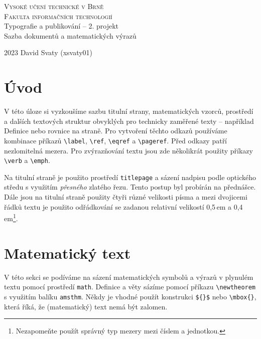 \documentclass[hidelinks, twocolumn, a4paper, 11pt]{article}
\theoremstyle{definition}
\begin{document}
\begin{titlepage}
    
    \begin{center}
        \Huge
        \textsc{Vysoké učení technické v Brně \\[0.5em]
        {\huge Fakulta informačních technologií}} \\
        {\LARGE Typografie a publikování -- 2. projekt \\[0.4em]
        Sazba dokumentů a matematických výrazů} \\
    \end{center}

    {\LARGE 2023 \hfill David Svaty (xsvaty01)}

\end{titlepage}

\section*{Úvod}
V této úloze si vyzkoušíme sazbu titulní strany, matematických vzorců, 
prostředí a dalších textových struktur obvyklých pro technicky zaměřené texty --
například Definice nebo rovnice na straně. 
Pro vytvoření těchto odkazů používáme kombinace příkazů
\verb|\label|, \verb|\ref|, \verb|\eqref| a \verb|\pageref|. Před odkazy patří nezlomitelná mezera. 
Pro zvýrazňování textu jsou zde několikrát použity příkazy \verb|\verb| a \verb|\emph|.

Na titulní straně je použito prostředí \verb|titlepage| a sázení nadpisu podle optického
středu s využitím \textsl{přesného} zlatého řezu. Tento postup byl probírán na přednášce.
Dále jsou na titulní straně použity čtyři různé velikosti písma a 
mezi dvojicemi řádků textu je použito odřádkování se zadanou relativní velikostí 
0,5\,em a 0,4\,em\footnote[1]{Nezapomeňte použít správný typ mezery mezi číslem a jednotkou.}.

\section{Matematický text}

V této sekci se podíváme na sázení matematických symbolů a výrazů v plynulém textu 
pomocí prostředí \verb|math|. Definice a věty sázíme pomocí příkazu \verb|\newtheorem| s 
využitím balíku \verb|amsthm|. Někdy je vhodné použít konstrukci \verb|${}$| nebo \verb|\mbox{}|, 
která říká, že (matematický) text nemá být zalomen. 
\end{document}
